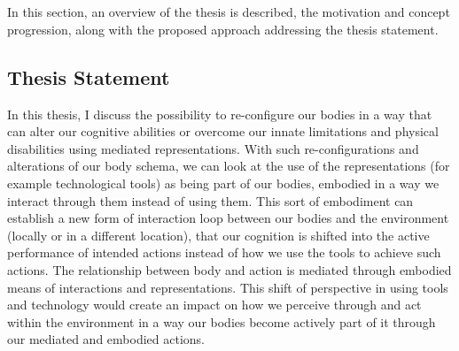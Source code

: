 
\pagebreak
\section{\ProposalKeyword}%




In this section, an overview of the thesis is described, the motivation and concept progression, along with the proposed approach addressing the thesis statement. 

\subsection{Thesis Statement}

In this thesis, I discuss the possibility to re-configure our bodies in a way that can alter our cognitive abilities or overcome our innate limitations and physical disabilities using mediated representations. With such re-configurations and alterations of our body schema, we can look at the use of the representations (for example technological tools) as being part of our bodies, embodied in a way we interact through them instead of using them. This sort of embodiment can establish a new form of interaction loop between our bodies and the environment (locally or in a different location), that our cognition is shifted into the active performance of intended actions instead of how we use the tools to achieve such actions. The relationship between body and action is mediated through embodied means of interactions and representations. This shift of perspective in using tools and technology would create an impact on how we perceive through and act within the environment in a way our bodies become actively part of it through our mediated and embodied actions. 


